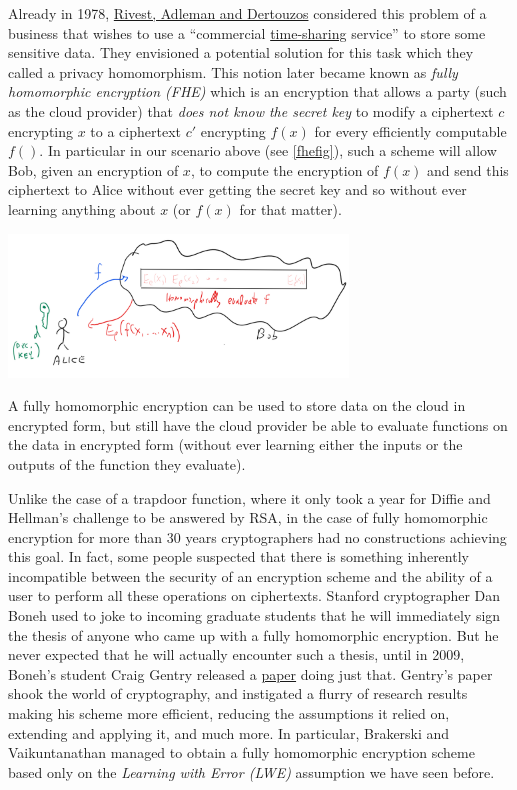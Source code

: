 Already in 1978,
\href{http://luca-giuzzi.unibs.it/corsi/Support/papers-cryptography/RAD78.pdf}{Rivest,
Adleman and Dertouzos} considered this problem of a business that wishes
to use a ``commercial
\href{https://en.wikipedia.org/wiki/Time-sharing}{time-sharing}
service'' to store some sensitive data. They envisioned a potential
solution for this task which they called a privacy homomorphism. This
notion later became known as \emph{fully homomorphic encryption (FHE)}
which is an encryption that allows a party (such as the cloud provider)
that \emph{does not know the secret key} to modify a ciphertext \(c\)
encrypting \(x\) to a ciphertext \(c'\) encrypting \(f(x)\) for every
efficiently computable \(f()\). In particular in our scenario above (see
\cref{fhefig}), such a scheme will allow Bob, given an encryption of
\(x\), to compute the encryption of \(f(x)\) and send this ciphertext to
Alice without ever getting the secret key and so without ever learning
anything about \(x\) (or \(f(x)\) for that matter).

\begin{marginfigure}
\centering
\includegraphics[width=\linewidth, height=1.5in, keepaspectratio]{../figure/fhedescription.png}
\caption{A fully homomorphic encryption can be used to store data on the
cloud in encrypted form, but still have the cloud provider be able to
evaluate functions on the data in encrypted form (without ever learning
either the inputs or the outputs of the function they evaluate).}
\label{fhefig}
\end{marginfigure}

Unlike the case of a trapdoor function, where it only took a year for
Diffie and Hellman's challenge to be answered by RSA, in the case of
fully homomorphic encryption for more than 30 years cryptographers had
no constructions achieving this goal. In fact, some people suspected
that there is something inherently incompatible between the security of
an encryption scheme and the ability of a user to perform all these
operations on ciphertexts. Stanford cryptographer Dan Boneh used to joke
to incoming graduate students that he will immediately sign the thesis
of anyone who came up with a fully homomorphic encryption. But he never
expected that he will actually encounter such a thesis, until in 2009,
Boneh's student Craig Gentry released a
\href{https://crypto.stanford.edu/craig/}{paper} doing just that.
Gentry's paper shook the world of cryptography, and instigated a flurry
of research results making his scheme more efficient, reducing the
assumptions it relied on, extending and applying it, and much more. In
particular, Brakerski and Vaikuntanathan managed to obtain a fully
homomorphic encryption scheme based only on the \emph{Learning with
Error (LWE)} assumption we have seen before.

